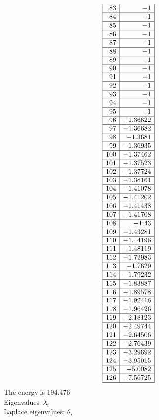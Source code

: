 \documentclass[12pt]{article}
\begin{document}
{$$\begin{array}{|r|r|}
83 & -1\\
\hline
84 & -1\\
\hline
85 & -1\\
\hline
86 & -1\\
\hline
87 & -1\\
\hline
88 & -1\\
\hline
89 & -1\\
\hline
90 & -1\\
\hline
91 & -1\\
\hline
92 & -1\\
\hline
93 & -1\\
\hline
94 & -1\\
\hline
95 & -1\\
\hline
96 & -1.36622\\
\hline
97 & -1.36682\\
\hline
98 & -1.3681\\
\hline
99 & -1.36935\\
\hline
100 & -1.37462\\
\hline
101 & -1.37523\\
\hline
102 & -1.37724\\
\hline
103 & -1.38161\\
\hline
104 & -1.41078\\
\hline
105 & -1.41202\\
\hline
106 & -1.41438\\
\hline
107 & -1.41708\\
\hline
108 & -1.43\\
\hline
109 & -1.43281\\
\hline
110 & -1.44196\\
\hline
111 & -1.48119\\
\hline
112 & -1.72983\\
\hline
113 & -1.7629\\
\hline
114 & -1.79232\\
\hline
115 & -1.83887\\
\hline
116 & -1.89578\\
\hline
117 & -1.92416\\
\hline
118 & -1.96426\\
\hline
119 & -2.18123\\
\hline
120 & -2.49744\\
\hline
121 & -2.64506\\
\hline
122 & -2.76439\\
\hline
123 & -3.29692\\
\hline
124 & -3.95015\\
\hline
125 & -5.0082\\
\hline
126 & -7.56725\\
\hline
\end{array}
$$
The energy is 194.476\\
Eigenvalues: $\lambda_i$\\
Laplace eigenvalues: $\theta_i$\\


}
\end{document}
